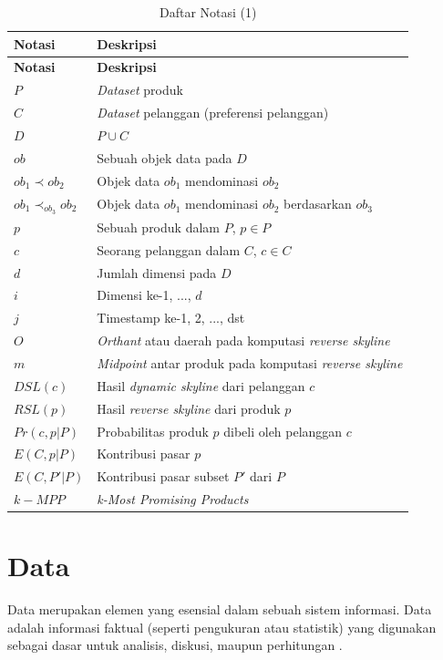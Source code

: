 \begin{longtable}{| p{3cm} | p{6cm} |} 
	\caption{Daftar Notasi (1) \label{tab:daftar-notasi-1}}\\
	\hline
	\textbf{Notasi} & \textbf{Deskripsi}\\ \hline
	\endfirsthead
	\hline
	\textbf{Notasi} & \textbf{Deskripsi}\\ \hline
	\endhead
	$P$ & \textit{Dataset} produk\\ \hline
	$C$ & \textit{Dataset} pelanggan (preferensi pelanggan)\\ \hline
	$D$ & $P \cup C$ \\ \hline
	$ob$ & Sebuah objek data pada $D$\\ \hline
	$ob_1 \prec ob_2$ & Objek data $ob_1$ mendominasi $ob_2$\\ \hline
	$ob_1 \prec_{ob_3} ob_2$ & Objek data $ob_1$ mendominasi $ob_2$ berdasarkan $ob_3$\\ \hline
	$p$ & Sebuah produk dalam $P$, $p \in P$\\ \hline
	$c$ & Seorang pelanggan dalam $C$, $c \in C$\\ \hline
	$d$ & Jumlah dimensi pada $D$\\ \hline
	$i$ & Dimensi ke-1, ..., $d$\\ \hline
	$j$ & Timestamp ke-1, 2, ..., dst\\ \hline
	$O$ & \textit{Orthant} atau daerah pada komputasi \textit{reverse skyline}\\ \hline
	$m$ & \textit{Midpoint} antar produk pada komputasi \textit{reverse skyline}\\ \hline
	$DSL(c)$ & Hasil \textit{dynamic skyline} dari pelanggan $c$\\ \hline
	$RSL(p)$ & Hasil \textit{reverse skyline} dari produk $p$\\ \hline
	$Pr(c, p|P)$ & Probabilitas produk $p$ dibeli oleh pelanggan $c$ \\ \hline
	$E(C, p|P)$ & Kontribusi pasar $p$\\ \hline
	$E(C, P'|P)$ & Kontribusi pasar subset $P'$ dari $P$ \\ \hline
	$k-MPP$ & \textit{k-Most Promising Products} \\ \hline
\end{longtable}

\section{Data}
\tab Data merupakan elemen yang esensial dalam sebuah sistem informasi. Data adalah informasi faktual (seperti pengukuran atau statistik) yang digunakan sebagai dasar untuk analisis, diskusi, maupun perhitungan \cite{data}. 

